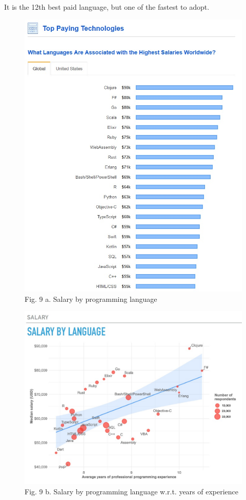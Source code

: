 \documentclass[11pt]{article}
\makeatletter
\def\maxwidth{\ifdim\Gin@nat@width>\linewidth\linewidth
    \else\Gin@nat@width\fi}
\let\Oldincludegraphics\includegraphics
\renewcommand{\includegraphics}[1]{\Oldincludegraphics[width=.8\maxwidth]{#1}}
\makeatother
\begin{document}
    It is the 12th best paid language, but one of the fastest to adopt.

    \begin{figure}[H]
\centering
\includegraphics{figs/stackoverflowbestpaid.jpg}
\caption{Fig. 9 a. Salary by programming language}
\end{figure}

    \begin{figure}[H]
\centering
\includegraphics{figs/salarybylanguage.jpg}
\caption{Fig. 9 b. Salary by programming language w.r.t. years of
experience}
\end{figure}
\end{document}
